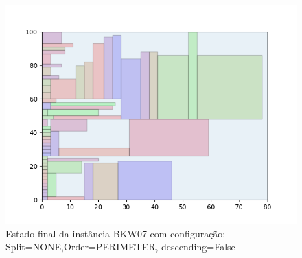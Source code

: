 \begin{figure}[H]
    \centering
    \caption[]{Estado final da instância BKW07 com configuração: Split=NONE,Order=PERIMETER, descending=False}
    \label{fig:bkw07-none-perimeter-false}
    \includegraphics[scale=0.5]{output/figures/bkw/bkw07/none/perimeter/false/00}
\end{figure}
